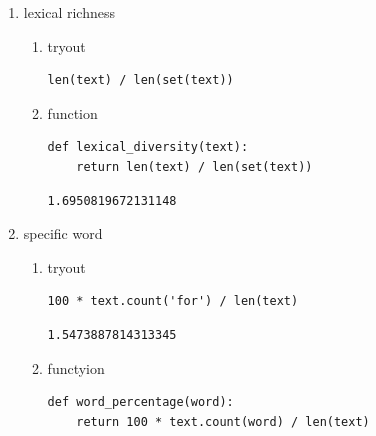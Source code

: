 \documentclass[11pt]{article}
\begin{document}
\begin{enumerate}
\begin{verbatim}
'opportunities',
'or',
'other',
'our',
'out',
'paced',
'partners',
'perks',
'personal',
'perspectives',
'platform',
'plattform',
'positive',
'potential',
'priorities',
'proactive',
'public',
'python',
'qualifications',
'questions',
'quick',
'r',
'radar',
're',
'recruiter',
'related',
'relevant',
'relocation',
'reports',
'represent',
'research',
'responsibility',
'run',
's',
'salary',
'science',
'segment',
'seit',
'senior',
'services',
'sets',
'share',
'shop',
'shopping',
'showcases',
'similar',
'size',
'skill',
'skills',
'solutions',
'solve',
'spierling',
'sports',
'sql',
'stakeholders',
'state',
'statistical',
'statistics',
'strategy',
'structures',
'subject',
'tailored',
'team',
'teams',
'tech',
'technical',
'term',
'than',
'that',
'the',
'their',
'them',
'things',
'thinking',
'through',
'time',
'times',
'to',
'toe',
'together',
'too',
'top',
'transforming',
'transport',
'trust',
'umfassendes',
'understanding',
'unseren',
'up',
'use',
'user',
'using',
'valuable',
'variety',
'volunteering',
'warehouse',
'ways',
'we',
'well',
'what',
'where',
'which',
'will',
'wir',
'with',
'work',
'working',
'workplace',
'x',
'years',
'you',
'your',
'zalando']
\end{verbatim}
\item lexical richness
\label{sec:org27063ea}
\begin{enumerate}
\item tryout
\label{sec:org281f1b3}
\begin{verbatim}
len(text) / len(set(text))
\end{verbatim}

\item function
\label{sec:org33caec5}
\begin{verbatim}
def lexical_diversity(text):
    return len(text) / len(set(text))
\end{verbatim}

\begin{verbatim}
1.6950819672131148
\end{verbatim}
\end{enumerate}
\item specific word
\label{sec:org9a047d8}
\begin{enumerate}
\item tryout
\label{sec:orgecc3d34}
\begin{verbatim}
100 * text.count('for') / len(text)
\end{verbatim}

\begin{verbatim}
1.5473887814313345
\end{verbatim}
\item functyion
\label{sec:orge20b842}
\begin{verbatim}
def word_percentage(word):
    return 100 * text.count(word) / len(text)
\end{verbatim}
\end{enumerate}
\end{enumerate}
\end{document}
